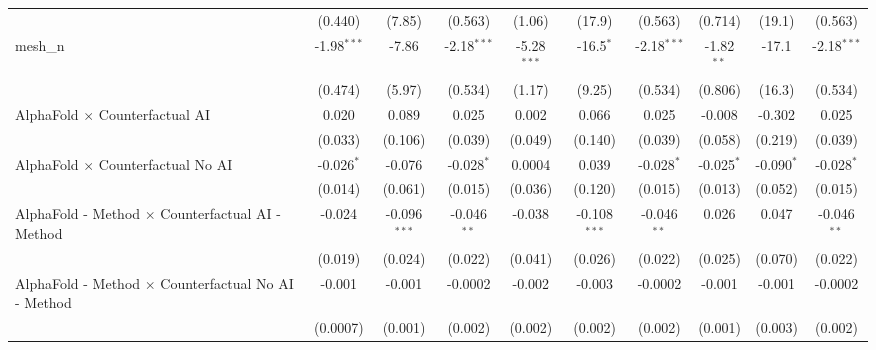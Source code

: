 \begin{tabular}{lccccccccc}
                                                               & (0.440)        & (7.85)         & (0.563)       & (1.06)        & (17.9)         & (0.563)       & (0.714)       & (19.1)        & (0.563)\\   
   mesh\_n                                                     & -1.98$^{***}$  & -7.86          & -2.18$^{***}$ & -5.28$^{***}$ & -16.5$^{*}$    & -2.18$^{***}$ & -1.82$^{**}$  & -17.1         & -2.18$^{***}$\\   
                                                               & (0.474)        & (5.97)         & (0.534)       & (1.17)        & (9.25)         & (0.534)       & (0.806)       & (16.3)        & (0.534)\\   
   AlphaFold $\times$ Counterfactual AI                        & 0.020          & 0.089          & 0.025         & 0.002         & 0.066          & 0.025         & -0.008        & -0.302        & 0.025\\   
                                                               & (0.033)        & (0.106)        & (0.039)       & (0.049)       & (0.140)        & (0.039)       & (0.058)       & (0.219)       & (0.039)\\   
   AlphaFold $\times$ Counterfactual No AI                     & -0.026$^{*}$   & -0.076         & -0.028$^{*}$  & 0.0004        & 0.039          & -0.028$^{*}$  & -0.025$^{*}$  & -0.090$^{*}$  & -0.028$^{*}$\\   
                                                               & (0.014)        & (0.061)        & (0.015)       & (0.036)       & (0.120)        & (0.015)       & (0.013)       & (0.052)       & (0.015)\\   
   AlphaFold - Method $\times$ Counterfactual AI - Method      & -0.024         & -0.096$^{***}$ & -0.046$^{**}$ & -0.038        & -0.108$^{***}$ & -0.046$^{**}$ & 0.026         & 0.047         & -0.046$^{**}$\\   
                                                               & (0.019)        & (0.024)        & (0.022)       & (0.041)       & (0.026)        & (0.022)       & (0.025)       & (0.070)       & (0.022)\\   
   AlphaFold - Method $\times$ Counterfactual No AI - Method   & -0.001         & -0.001         & -0.0002       & -0.002        & -0.003         & -0.0002       & -0.001        & -0.001        & -0.0002\\   
                                                               & (0.0007)       & (0.001)        & (0.002)       & (0.002)       & (0.002)        & (0.002)       & (0.001)       & (0.003)       & (0.002)\\   

\end{tabular}

